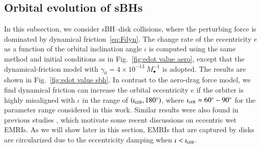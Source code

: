\documentclass[aps,prx,reprint,superscriptaddress,nofootinbib,longbibliography]{revtex4-1}
\begin{document}
\subsection{Orbital evolution of sBHs}
In this subsection, we consider  sBH–disk collisions, where the perturbing force is dominated by dynamical friction~\eqref{eq:Fdyn}. The change rate of the eccentricity $e$ as a function of the orbital inclination angle $\iota$ is computed using the same method and initial conditions as in Fig.~\ref{fig:edot value aero}, except that the dynamical-friction model with $\gamma_{0}=4\times10^{-13}\ M_{\bullet}^{-1}$ is adopted. The results are shown in Fig.~\ref{fig:edot value sbh}. 
In contrast to the aero-drag force model, we find dynamical friction can increase the orbital eccentricity $e$
if the orbiter is highly misaligned  with $\iota$ in the range of $(\iota_{\rm crit}, 180^\circ)$, where $\iota_{\rm crit} \approx 60^\circ - 90^\circ$ for the parameter range considered in this work. Similar results were also found in previous studies \cite{Wang2024, spieksma2025gripdiskdraggingcompanion}, which motivate some recent discussions on eccentric wet EMRIs. As we will show later in this section, EMRIs that are captured by disks are circularized due to the eccentricity damping when $\iota < \iota_{\rm crit}$.
\end{document}
